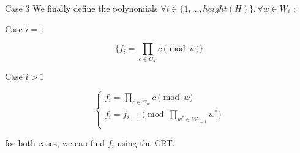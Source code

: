 \documentclass{beamer}
\begin{document}
\begin{frame}{Case 3}
    We finally define the polynomials $\forall i \in \{1,\dots,height(H)\}, \forall w \in W_{i}$ :

Case $i = 1$

\[\{ f_{i} = \prod_{c \in C_{w} } c \pmod w \}\]

Case $i > 1$

\begin{displaymath}
    \left\{
    \begin{array}{ll}
    f_{i} = \prod_{c \in C_{w} } c \pmod w \\
    f_{i} = f_{i-1} \pmod{\prod_{w^{*} \in W_{i-1}} w^{*}}\\
    \end{array}
    \right.
\end{displaymath}

for both cases, we can find $f_{i}$ using the CRT\@.
\end{frame}
\end{document}
